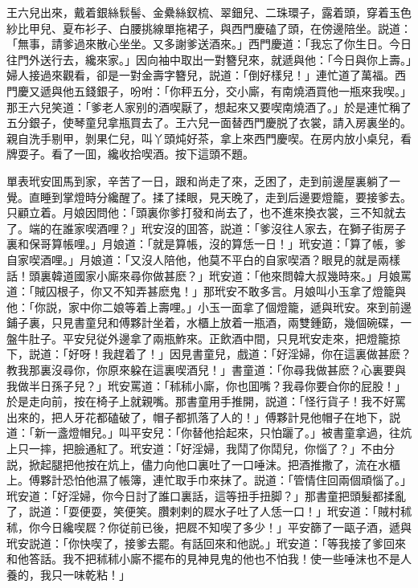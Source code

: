 王六兒出來，戴着銀絲䯼髻、金纍絲釵梳、翠鈿兒、二珠環子，露着頭，穿着玉色紗比甲兒、夏布衫子、白腰挑線單拖裙子，與西門慶磕了頭，在傍邊陪坐。説道：「無事，請爹過來散心坐坐。又多謝爹送酒來。」西門慶道：「我忘了你生日。今日往門外送行去，纔來家。」因向袖中取出一對簪兒來，就遞與他：「今日與你上壽。」婦人接過來觀看，卻是一對金壽字簪兒，説道：「倒好樣兒！」連忙道了萬福。西門慶又遞與他五錢銀子，吩咐：「你秤五分，交小廝，有南燒酒買他一瓶來我喫。」那王六兒笑道：「爹老人家别的酒喫厭了，想起來又要喫南燒酒了。」於是連忙稱了五分銀子，使琴童兒拿瓶買去了。王六兒一面替西門慶脱了衣裳，請入房裏坐的。親自洗手剔甲，剝果仁兒，叫丫頭炖好茶，拿上來西門慶喫。在房内放小桌兒，看牌耍子。看了一囬，纔收拾喫酒。按下這頭不題。

單表玳安囬馬到家，辛苦了一日，跟和尚走了來，乏困了，走到前邊屋裏躺了一覺。直睡到掌燈時分纔醒了。揉了揉眼，見天晚了，走到后邊要燈籠，要接爹去。只顧立着。月娘因問他：「頭裏你爹打發和尚去了，也不進來換衣裳，三不知就去了。端的在誰家喫酒哩？」玳安沒的囬答，説道：「爹沒往人家去，在獅子街房子裏和保哥算帳哩。」月娘道：「就是算帳，沒的算恁一日！」玳安道：「算了帳，爹自家喫酒哩。」月娘道：「又沒人陪他，他莫不平白的自家喫酒？眼見的就是兩樣話！頭裏韓道國家小廝來尋你做甚麽？」玳安道：「他來問韓大叔幾時來。」月娘罵道：「賊囚根子，你又不知弄甚麽鬼！」那玳安不敢多言。月娘叫小玉拿了燈籠與他：「你説，家中你二娘等着上壽哩。」小玉一面拿了個燈籠，遞與玳安。來到前邊鋪子裏，只見書童兒和傅夥計坐着，水櫃上放着一瓶酒，兩雙鍾筯，幾個碗碟，一盤牛肚子。平安兒従外邊拿了兩瓶鮓來。正飲酒中間，只見玳安走來，把燈籠掠下，説道：「好呀！我趕着了！」因見書童兒，戲道：「好淫婦，你在這裏做甚麽？教我那裏沒尋你，你原來躱在這裏喫酒兒！」書童道：「你尋我做甚麽？心裏要與我做半日孫子兒？」玳安罵道：「秫秫小廝，你也囬嘴？我尋你要㒲你的屁股！」於是走向前，按在椅子上就親嘴。那書童用手推開，説道：「怪行貨子！我不好罵出來的，把人牙花都磕破了，帽子都抓落了人的！」傅夥計見他帽子在地下，説道：「新一盞燈帽兒。」叫平安兒：「你替他拾起來，只怕躧了。」被書童拿過，往炕上只一摔，把臉通紅了。玳安道：「好淫婦，我鬦了你鬦兒，你惱了？」不由分説，掀起腿把他按在炕上，儘力向他口裏吐了一口唾沫。把酒推撒了，流在水櫃上。傅夥計恐怕他濕了帳簿，連忙取手巾來抹了。説道：「管情住回兩個頑惱了。」玳安道：「好淫婦，你今日討了誰口裏話，這等扭手扭脚？」那書童把頭髮都揉亂了，説道：「耍便耍，笑便笑。臢剌剌的㞞水子吐了人恁一口！」玳安道：「賊村秫秫，你今日纔喫㞞？你従前已後，把㞞不知喫了多少！」平安篩了一甌子酒，遞與玳安説道：「你快喫了，接爹去罷。有話回來和他説。」玳安道：「等我接了爹回來和他答話。我不把秫秫小廝不擺布的見神見鬼的他也不怕我！使一些唾沫也不是人養的，我只一味乾粘！」

